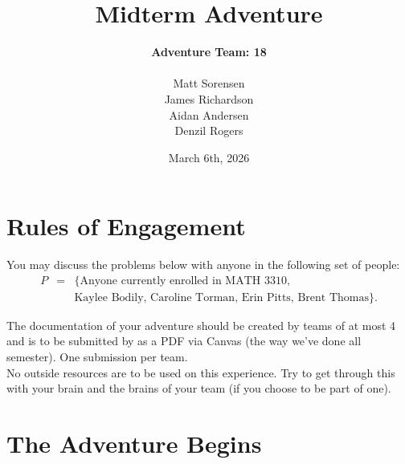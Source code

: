 \documentclass[answers]{exam}
\title{Midterm Adventure}
\author{\textbf{Adventure Team: 18}
\\\\
Matt Sorensen\\
James Richardson \\
Aidan Andersen \\
Denzil Rogers\\
}
\date{March 6th, 2026}
\begin{document}
\maketitle



	\section*{Rules of Engagement}
	
	You may discuss the problems below with anyone in the following set of people:
	\begin{eqnarray*}P &=& \{\mbox{Anyone currently enrolled in MATH 3310}, \\ 		&& \mbox{Kaylee Bodily, Caroline Torman, Erin Pitts, Brent Thomas}\}.\end{eqnarray*}
	
    The documentation of your adventure should be created by teams of at most 4 and is to be submitted by  as a PDF via Canvas (the way we've done all semester). One submission per team.\\
        
    No outside resources are to be used on this experience.
	Try to get through this with your brain and the brains of your team (if you choose to be part of one). \\
	
	
	\section{The Adventure Begins} 
	
\end{document}
